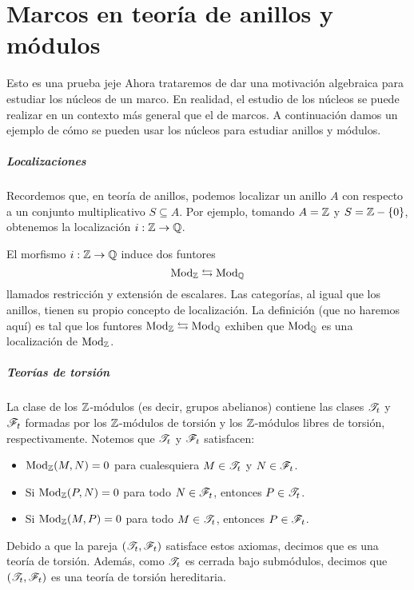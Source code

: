 \chapter{Marcos en teoría de anillos y módulos}
Esto es una prueba jeje
Ahora trataremos de dar una motivación algebraica para
estudiar los núcleos de un marco.
En realidad, el estudio de los núcleos se puede realizar
en un contexto más general que el de marcos.
A continuación damos un ejemplo de cómo se pueden usar
los núcleos para estudiar anillos y módulos.

\paragraph{Localizaciones}
Recordemos que, en teoría de anillos,
podemos localizar un anillo $A$ con respecto a un conjunto
multiplicativo $S\subseteq A$.
Por ejemplo, tomando $A=\mathbb Z$ y $S=\mathbb Z-\{0\}$,
obtenemos la localización $i:\mathbb Z\to\mathbb Q$.

El morfismo $i:\mathbb Z\to\mathbb Q$ induce dos funtores
\[
    \mathrm{Mod}_\mathbb Z\leftrightarrows\mathrm{Mod}_\mathbb Q
\]
llamados restricción y extensión de escalares.
Las categorías, al igual que los anillos,
tienen su propio concepto de localización.
La definición (que no haremos aquí) es tal que
los funtores $\mathrm{Mod}_\mathbb Z\leftrightarrows\mathrm{Mod}_\mathbb Q$
exhiben que $\mathrm{Mod}_\mathbb Q$ es una localización de $\mathrm{Mod}_\mathbb Z$.

\paragraph{Teorías de torsión}
La clase de los $\mathbb Z$-módulos (es decir, grupos abelianos)
contiene las clases $\mathscr{T}_t$ y $\mathscr{F}_t$
formadas por los $\mathbb Z$-módulos de torsión y los $\mathbb Z$-módulos
libres de torsión, respectivamente.
Notemos que $\mathscr{T}_t$ y $\mathscr{F}_t$ satisfacen:
\begin{itemize}
    \item
    $\mathrm{Mod}_\mathbb Z(M,N)=0$ para cualesquiera $M\in\mathscr{T}_t$
    y $N\in\mathscr{F}_t$.
    \item
    Si $\mathrm{Mod}_\mathbb Z(P,N)=0$ para todo $N\in\mathscr{F}_t$,
    entonces $P\in\mathscr{T}_t$.
    \item
    Si $\mathrm{Mod}_\mathbb Z(M,P)=0$ para todo $M\in\mathscr{T}_t$,
    entonces $P\in\mathscr{F}_t$.
\end{itemize}
Debido a que la pareja $(\mathscr{T}_t,\mathscr{F}_t)$ satisface estos
axiomas, decimos que es una teoría de torsión.
Además, como $\mathscr{T}_t$ es cerrada bajo submódulos,
decimos que $(\mathscr{T}_t,\mathscr{F}_t)$ es una teoría de torsión hereditaria.

